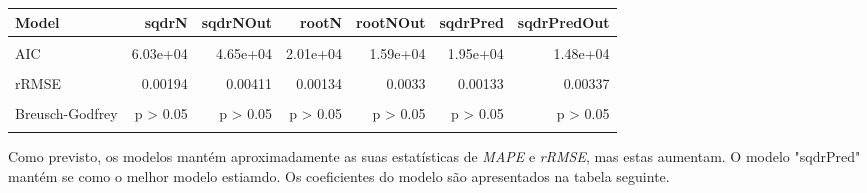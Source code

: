 \documentclass[justified, 11pt]{scrartcl}\usepackage[]{graphicx}\usepackage[]{xcolor}
\newenvironment{knitrout}{}{} %
\begin{document}
\begin{knitrout}
\begin{table}
\begin{tabular}{l|r|r|r|r|r|r}
\hline
Model & sqdrN & sqdrNOut & rootN & rootNOut & sqdrPred & sqdrPredOut\\
\hline
\cellcolor{gray!6}{R2} & \cellcolor{gray!6}{0.976} & \cellcolor{gray!6}{0.964} & \cellcolor{gray!6}{0.371} & \cellcolor{gray!6}{0.408} & \cellcolor{gray!6}{0.444} & \cellcolor{gray!6}{0.511}\\
\hline
AIC & 6.03e+04 & 4.65e+04 & 2.01e+04 & 1.59e+04 & 1.95e+04 & 1.48e+04\\
\hline
\cellcolor{gray!6}{MAPE} & \cellcolor{gray!6}{0.137} & \cellcolor{gray!6}{0.112} & \cellcolor{gray!6}{0.0879} & \cellcolor{gray!6}{0.0839} & \cellcolor{gray!6}{0.0863} & \cellcolor{gray!6}{0.0858}\\
\hline
rRMSE & 0.00194 & 0.00411 & 0.00134 & 0.0033 & 0.00133 & 0.00337\\
\hline
\cellcolor{gray!6}{Breusch-Pagan} & \cellcolor{gray!6}{p > 0.05} & \cellcolor{gray!6}{p > 0.05} & \cellcolor{gray!6}{p > 0.05} & \cellcolor{gray!6}{p > 0.05} & \cellcolor{gray!6}{p > 0.05} & \cellcolor{gray!6}{p > 0.05}\\
\hline
Breusch-Godfrey & p > 0.05 & p > 0.05 & p > 0.05 & p > 0.05 & p > 0.05 & p > 0.05\\
\hline
\cellcolor{gray!6}{Jarque-Bera} & \cellcolor{gray!6}{p < 0.05} & \cellcolor{gray!6}{p < 0.05} & \cellcolor{gray!6}{p < 0.05} & \cellcolor{gray!6}{p < 0.05} & \cellcolor{gray!6}{p < 0.05} & \cellcolor{gray!6}{p < 0.05}\\
\hline
\end{tabular}
\endgroup{}
\end{table}

\end{knitrout}
Como previsto, os modelos mantém aproximadamente as suas estatísticas de \textit{MAPE} e \textit{rRMSE}, mas estas aumentam. O modelo "sqdrPred" mantém se como o melhor modelo estiamdo.
Os coeficientes do modelo são apresentados na tabela seguinte.\\
\footnotesize
\end{document}
